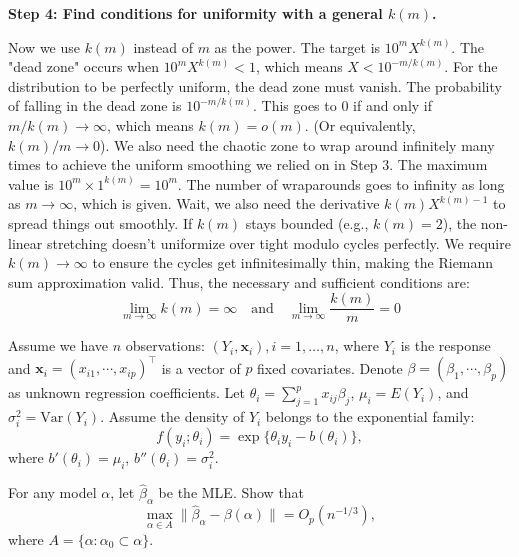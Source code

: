 \begin{solution}
\textbf{Step 4: Find conditions for uniformity with a general $k(m)$.}

Now we use $k(m)$ instead of $m$ as the power. The target is $10^m X^{k(m)}$.
The "dead zone" occurs when $10^m X^{k(m)} < 1$, which means $X < 10^{-m/k(m)}$.
For the distribution to be perfectly uniform, the dead zone must vanish. The probability of falling in the dead zone is $10^{-m/k(m)}$.
This goes to 0 if and only if $m/k(m) \to \infty$, which means $k(m) = o(m)$. (Or equivalently, $k(m)/m \to 0$).
We also need the chaotic zone to wrap around infinitely many times to achieve the uniform smoothing we relied on in Step 3. The maximum value is $10^m \times 1^{k(m)} = 10^m$. The number of wraparounds goes to infinity as long as $m \to \infty$, which is given.
Wait, we also need the derivative $k(m) X^{k(m)-1}$ to spread things out smoothly. If $k(m)$ stays bounded (e.g., $k(m)=2$), the non-linear stretching doesn't uniformize over tight modulo cycles perfectly. We require $k(m) \to \infty$ to ensure the cycles get infinitesimally thin, making the Riemann sum approximation valid.
Thus, the necessary and sufficient conditions are:
\[ \lim_{m \to \infty} k(m) = \infty \quad \text{and} \quad \lim_{m \to \infty} \frac{k(m)}{m} = 0 \]
\end{solution}

\begin{exercise}\label{probability:2022:4}
Assume we have $n$ observations: $(Y_i, \mathbf{x}_i), i = 1, \ldots, n$, where $Y_i$ is the response and $\mathbf{x}_i = (x_{i1}, \cdots, x_{ip})^\top$ is a vector of $p$ fixed covariates. Denote $\beta = (\beta_1, \cdots, \beta_p)$ as unknown regression coefficients. Let $\theta_i = \sum_{j=1}^p x_{ij}\beta_j$, $\mu_i = E(Y_i)$, and $\sigma_i^2 = \mathrm{Var}(Y_i)$. Assume the density of $Y_i$ belongs to the exponential family:
\[
f(y_i; \theta_i) = \exp\{\theta_i y_i - b(\theta_i)\},
\]
where $b'(\theta_i) = \mu_i$, $b''(\theta_i) = \sigma_i^2$.

For any model $\alpha$, let $\hat{\beta}_\alpha$ be the MLE. Show that
\[
\max_{\alpha \in A} \|\hat{\beta}_\alpha - \beta(\alpha)\| = O_p(n^{-1/3}),
\]
where $A = \{\alpha: \alpha_0 \subset \alpha\}$.
\end{exercise}

